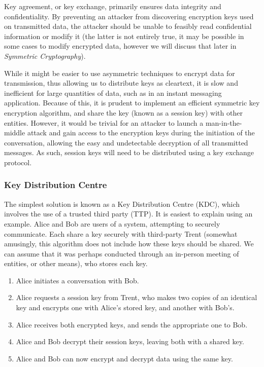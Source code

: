 Key agreement, or key exchange, primarily ensures data integrity and confidentiality. By preventing an attacker from discovering encryption keys used on transmitted data, the attacker should be unable to feasibly read confidential information or modify it (the latter is not entirely true, it may be possible in some cases to modify encrypted data, however we will discuss that later in \emph{Symmetric Cryptography}).

While it might be easier to use asymmetric techniques to encrypt data for transmission, thus allowing us to distribute keys as cleartext, it is slow and inefficient for large quantities of data, such as in an instant messaging application. Because of this, it is prudent to implement an efficient symmetric key encryption algorithm, and share the key (known as a session key) with other entities. However, it would be trivial for an attacker to launch a man-in-the-middle attack and gain access to the encryption keys during the initiation of the conversation, allowing the easy and undetectable decryption of all transmitted messages. As such, session keys will need to be distributed using a key exchange protocol.

\subsubsection{Key Distribution Centre}

The simplest solution is known as a Key Distribution Centre (KDC), which involves the use of a trusted third party (TTP). It is easiest to explain using an example. Alice and Bob are users of a system, attempting to securely communicate. Each share a key securely with third-party Trent (somewhat amusingly, this algorithm does not include how these keys should be shared. We can assume that it was perhaps conducted through an in-person meeting of entities, or other means), who stores each key. 

\begin{enumerate}
	\item Alice initiates a conversation with Bob.
	\item Alice requests a session key from Trent, who makes two copies of an identical key and encrypts one with Alice's stored key, and another with Bob's.
	\item Alice receives both encrypted keys, and sends the appropriate one to Bob.
	\item Alice and Bob decrypt their session keys, leaving both with a shared key.
	\item Alice and Bob can now encrypt and decrypt data using the same key.
\end{enumerate}


